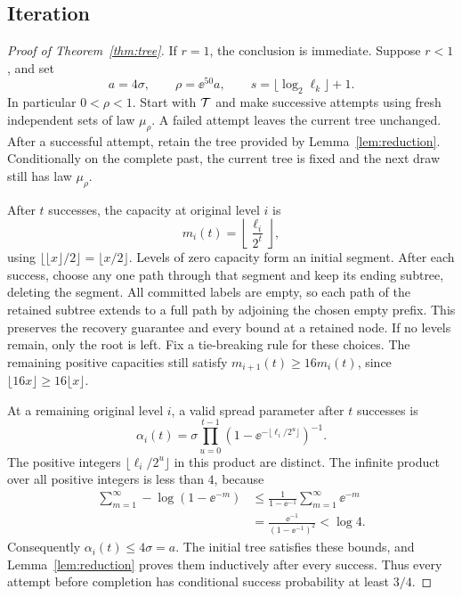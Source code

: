 \subsection{Iteration}

\begin{proof}[Proof of Theorem~\ref{thm:tree}]
If $r=1$, the conclusion is immediate. Suppose $r<1$, and set
\[
 a=4\sigma,\qquad \rho=\ee^{50}a,
 \qquad s=\lfloor\log_2\ell_k\rfloor+1.
\]
In particular $0<\rho<1$. Start with $\mathcal T$ and make successive
attempts using fresh independent sets of law $\mu_\rho$. A failed attempt leaves
the current tree unchanged. After a successful attempt, retain the
tree provided by Lemma~\ref{lem:reduction}.
Conditionally on the complete past, the current tree is fixed and the
next draw still has law $\mu_\rho$.

After $t$ successes, the capacity at original level $i$ is
\begin{equation}\label{eq:capacities}
 m_i(t)=\left\lfloor\frac{\ell_i}{2^t}\right\rfloor,
\end{equation}
using $\lfloor\lfloor x\rfloor/2\rfloor=\lfloor x/2\rfloor$.
Levels of zero capacity form an initial segment. After each success,
choose any one path through that segment and keep its ending
subtree, deleting the segment. All committed labels are empty, so
each path of the retained subtree extends to a full path by adjoining
the chosen empty prefix. This preserves the recovery guarantee and every
bound at a retained node. If no levels remain, only the root is left.
Fix a tie-breaking rule for these choices. The remaining positive capacities still
satisfy $m_{i+1}(t)\ge16m_i(t)$, since
$\lfloor16x\rfloor\ge16\lfloor x\rfloor$.

At a remaining original level $i$, a valid spread parameter after
$t$ successes is
\begin{equation}\label{eq:spread-iteration}
 \alpha_i(t)=\sigma
 \prod_{u=0}^{t-1}
 \left(1-\ee^{-\lfloor\ell_i/2^u\rfloor}\right)^{-1}.
\end{equation}
The positive integers $\lfloor\ell_i/2^u\rfloor$ in this product are
distinct. The infinite product over all positive integers is less
than $4$, because
\begin{align*}
 \sum_{m=1}^{\infty}-\log(1-\ee^{-m})
 &\le \frac{1}{1-\ee^{-1}}\sum_{m=1}^{\infty}\ee^{-m}\\
 &=\frac{\ee^{-1}}{(1-\ee^{-1})^2}<\log 4.
\end{align*}
Consequently $\alpha_i(t)\le4\sigma=a$. The initial tree satisfies
these bounds, and Lemma~\ref{lem:reduction} proves them inductively
after every success. Thus every attempt before completion has
conditional success probability at least $3/4$.


\end{proof}
